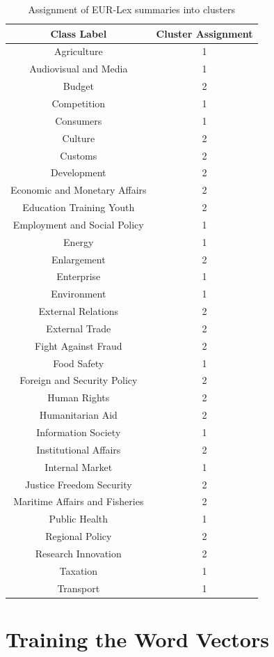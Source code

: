 \begin{table}[!ht]
\centering
\begin{tabular}{cc}
\hline
\textbf{Class Label} & \textbf{Cluster Assignment} \\ \hline
Agriculture & 1 \\ 
Audiovisual and Media & 1 \\ 
Budget & 2 \\ 
Competition & 1 \\ 
Consumers & 1 \\ 
Culture & 2 \\ 
Customs & 2 \\ 
Development & 2 \\ 
Economic and Monetary Affairs & 2 \\ 
Education Training Youth & 2 \\ 
Employment and Social Policy & 1 \\ 
Energy & 1 \\ 
Enlargement & 2 \\ 
Enterprise & 1 \\ 
Environment & 1 \\ 
External Relations & 2 \\ 
External Trade & 2 \\ 
Fight Against Fraud & 2 \\ 
Food Safety & 1 \\ 
Foreign and Security Policy & 2 \\ 
Human Rights & 2 \\ 
Humanitarian Aid & 2 \\ 
Information Society & 1 \\ 
Institutional Affairs & 2 \\ 
Internal Market & 1 \\ 
Justice Freedom Security & 2 \\ 
Maritime Affairs and Fisheries & 2 \\ 
Public Health & 1 \\ 
Regional Policy & 2 \\ 
Research Innovation & 2 \\ 
Taxation & 1 \\ 
Transport & 1 \\ \hline
\end{tabular}
\caption{Assignment of EUR-Lex summaries into clusters}
\label{table:ClusterAssignments32Classes}
\end{table}

\clearpage
\section{Training the Word Vectors}

